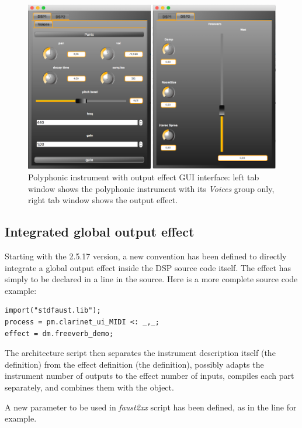 \begin{figure}[!ht]
\begin{center}
\includegraphics[width=\columnwidth]{images/poly_ui_effect}
\caption{\footnotesize Polyphonic instrument with output effect GUI interface: left tab window shows the polyphonic instrument with its \textit{Voices} group only, right tab window shows the output effect.}
\label{fig:poly-ui-effect}
\end{center}
\end{figure}

\subsection{Integrated global output effect}

Starting with the 2.5.17 version, a new convention has been defined to directly integrate a global output effect inside the DSP source code itself. The effect has simply to be declared in a  line in the source. Here is a more complete source code example:

\begin{lstlisting}
import("stdfaust.lib");
process = pm.clarinet_ui_MIDI <: _,_;
effect = dm.freeverb_demo;
\end{lstlisting}

The architecture script then separates the instrument description itself (the  definition) from the effect definition (the   definition), possibly adapts the instrument number of outputs to the effect number of inputs, compiles each part separately, and combines them with the  object.

A new  parameter to be used in \textit{faust2xx} script has been defined, as in the  line for example.

